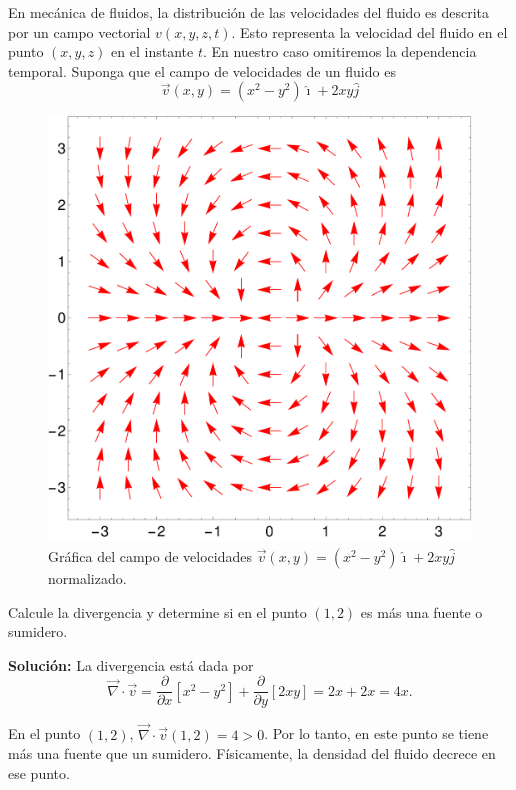 \begin{ejemplo}
    En mecánica de fluidos, la distribución de las velocidades del fluido es descrita por un campo vectorial $v(x, y, z, t)$. Esto representa la velocidad del fluido en el punto $(x, y, z)$ en el instante $t$. En nuestro caso omitiremos la dependencia temporal. Suponga que el campo de velocidades de un fluido es
    $$\Vec{v}(x,y) = (x^2-y^2) \hat{\imath} + 2xy \hat{j}$$

    \begin{figure}[H]
    \centering
    \includegraphics[scale = 0.3]{Figuras/Ej-Divergencia}
    \caption{Gráfica del campo de velocidades $\Vec{v}(x,y) = (x^2-y^2) \hat{\imath} + 2xy \hat{j}$ normalizado.}
    \label{fig:Ej_Divergencia}
    \end{figure}

    Calcule la divergencia y determine si en el punto $(1,2)$ es más una fuente o sumidero.

    \textbf{Solución:} La divergencia está dada por
    $$\vec{\nabla} \cdot \Vec{v} = \frac{\partial}{\partial x}[x^2-y^2] + \frac{\partial}{\partial y}[2xy] = 2x+2x = 4x. $$

    En el punto $(1,2)$, $\vec{\nabla} \cdot \Vec{v}(1,2) = 4 > 0$. Por lo tanto, en este punto se tiene más una fuente que un sumidero. Físicamente, la densidad del fluido decrece en ese punto.
\end{ejemplo}
  

